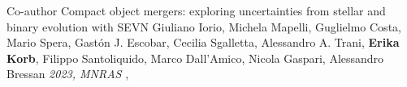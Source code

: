 %
%
%

\begin{experiences}
    \publicationtags
    {Co-author}   {Compact object mergers: exploring uncertainties from stellar and binary evolution with SEVN}
    {Giuliano Iorio, Michela Mapelli, Guglielmo Costa, Mario Spera, Gastón J. Escobar, Cecilia Sgalletta, Alessandro A. Trani, \textbf{Erika Korb}, Filippo Santoliquido, Marco Dall'Amico, Nicola Gaspari, Alessandro Bressan}
    {\textit{2023, MNRAS}}
    { ,    }      
\end{experiences}

